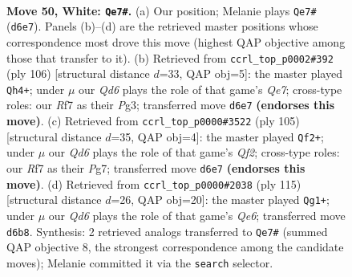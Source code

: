 \documentclass[11pt]{article}
\begin{document}
\clearpage

\begin{figure}[p]\centering
\begin{subfigure}{0.46\textwidth}\centering
\resizebox{\linewidth}{!}{%
\newchessgame
\chessboard[
  setfen={4k3/5R2/3Q4/1qp5/p7/1P6/P7/6K1 w - - 9 50},
  showmover=false,
  pgfstyle=straightmove, color=movearrow, markmove={d6-e7}
]}
\caption{}
\end{subfigure}\hfill
\begin{subfigure}{0.46\textwidth}\centering
\resizebox{\linewidth}{!}{%
\newchessgame
\chessboard[
  setfen={8/4Q3/7p/5q2/4p1k1/4P1P1/8/6K1 w - - 1 54},
  showmover=false,
  pgfstyle=straightmove, color=movearrow, markmove={e7-h4}
]}
\caption{}
\end{subfigure}
\\[4pt]
\begin{subfigure}{0.46\textwidth}\centering
\resizebox{\linewidth}{!}{%
\newchessgame
\chessboard[
  setfen={8/5qpk/8/4Q3/p2P4/4p1KP/P7/8 b - - 3 53},
  showmover=false,
  pgfstyle=straightmove, color=movearrow, markmove={f7-f2}
]}
\caption{}
\end{subfigure}\hfill
\begin{subfigure}{0.46\textwidth}\centering
\resizebox{\linewidth}{!}{%
\newchessgame
\chessboard[
  setfen={6k1/5p2/5QP1/8/3Pp3/4q3/8/1K6 b - - 0 58},
  showmover=false,
  pgfstyle=straightmove, color=movearrow, markmove={e3-g1}
]}
\caption{}
\end{subfigure}
\caption{\textbf{Move 50, White: \texttt{Qe7\#}.} (a) Our position; Melanie plays \texttt{Qe7\#} (\texttt{d6e7}). Panels (b)--(d) are the retrieved master positions whose correspondence most drove this move (highest QAP objective among those that transfer to it). (b) Retrieved from \texttt{ccrl\_top\_p0002\#392} (ply 106) [structural distance $d$=33, QAP obj=5]: the master played \texttt{Qh4+}; under $\mu$ our \emph{Qd6} plays the role of that game's \emph{Qe7}; cross-type roles: our \emph{R}f7 as their \emph{P}g3; transferred move \texttt{d6e7} \textbf{(endorses this move)}. (c) Retrieved from \texttt{ccrl\_top\_p0000\#3522} (ply 105) [structural distance $d$=35, QAP obj=4]: the master played \texttt{Qf2+}; under $\mu$ our \emph{Qd6} plays the role of that game's \emph{Qf2}; cross-type roles: our \emph{R}f7 as their \emph{P}g7; transferred move \texttt{d6e7} \textbf{(endorses this move)}. (d) Retrieved from \texttt{ccrl\_top\_p0000\#2038} (ply 115) [structural distance $d$=26, QAP obj=20]: the master played \texttt{Qg1+}; under $\mu$ our \emph{Qd6} plays the role of that game's \emph{Qe6}; transferred move \texttt{d6b8}. Synthesis: 2 retrieved analogs transferred to \texttt{Qe7\#} (summed QAP objective 8, the strongest correspondence among the candidate moves); Melanie committed it via the \texttt{search} selector.}
\label{fig:thought-m98}
\end{figure}
\end{document}

